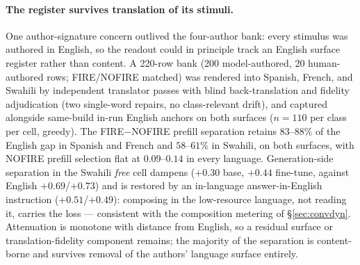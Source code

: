 \documentclass[10pt,a4paper,twocolumn]{article}
\begin{document}
\paragraph{The register survives translation of its stimuli.}
One author-signature concern outlived the four-author bank: every stimulus was
authored in English, so the readout could in principle track an English
surface register rather than content. A 220-row bank (200 model-authored, 20
human-authored rows; FIRE/NOFIRE matched) was rendered into Spanish, French,
and Swahili by independent translator passes with blind back-translation and
fidelity adjudication (two single-word repairs, no class-relevant drift), and
captured alongside same-build in-run English anchors on both surfaces
($n{=}110$ per class per cell, greedy). The FIRE$-$NOFIRE prefill separation
retains $83$--$88\%$ of the English gap in Spanish and French and
$58$--$61\%$ in Swahili, on both surfaces, with NOFIRE prefill selection flat
at $0.09$--$0.14$ in every language. Generation-side separation in the
Swahili \emph{free} cell dampens ($+0.30$ base, $+0.44$ fine-tune, against
English $+0.69$/$+0.73$) and is restored by an in-language
answer-in-English instruction ($+0.51$/$+0.49$): composing in the
low-resource language, not reading it, carries the loss --- consistent with
the composition metering of \S\ref{sec:convdyn}. Attenuation is monotone with
distance from English, so a residual surface or translation-fidelity
component remains; the majority of the separation is content-borne and
survives removal of the authors' language surface entirely.
\end{document}
